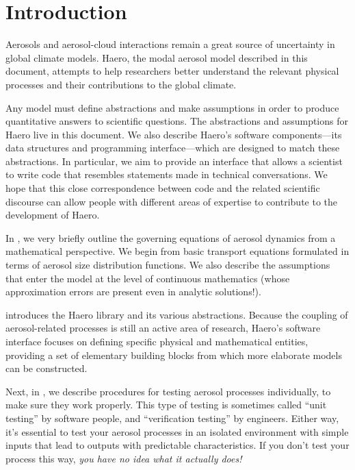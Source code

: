 \chapter{Introduction}

Aerosols and aerosol-cloud interactions remain a great source of uncertainty
in global climate models. Haero, the modal aerosol model described in this
document, attempts to help researchers better understand the relevant physical
processes and their contributions to the global climate.

Any model must define abstractions and make assumptions in order to produce
quantitative answers to scientific questions. The abstractions and assumptions
for Haero live in this document. We also describe Haero's software
components---its data structures and programming interface---which are designed
to match these abstractions. In particular, we aim to provide an interface that
allows a scientist to write code that resembles statements made in technical
conversations. We hope that this close correspondence between code and
the related scientific discourse can allow people with different areas of
expertise to contribute to the development of Haero.

In , we very briefly outline the governing equations of
aerosol dynamics from a mathematical perspective. We begin from basic transport
equations formulated in terms of aerosol size distribution functions. We also
describe the assumptions that enter the model at the level of continuous
mathematics (whose approximation errors are present even in analytic
solutions!).

 introduces the Haero library and its various abstractions.
Because the coupling of aerosol-related processes is still an active area of
research, Haero's software interface focuses on defining specific physical and
mathematical entities, providing a set of elementary building blocks from which
more elaborate models can be constructed.

Next, in , we describe procedures for testing aerosol processes
individually, to make sure they work properly. This type of testing is sometimes
called ``unit testing'' by software people, and ``verification testing'' by
engineers. Either way, it's essential to test your aerosol processes in an
isolated environment with simple inputs that lead to outputs with predictable
characteristics. If you don't test your process this way, {\em you have no idea
what it actually does!}

